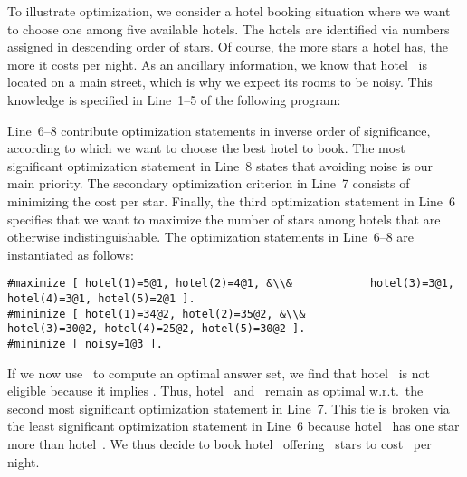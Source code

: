 \begin{example}\label{ex:opt}
To illustrate optimization, we consider a hotel booking situation
where we want to choose one among five available hotels.
The hotels are identified via numbers assigned in descending order of stars.
Of course, the more stars a hotel has, the more it costs per night.
As an ancillary information, we know that hotel~ is located
on a main street, which is why we expect its rooms to be noisy.
This knowledge is specified in Line~1--5 of the following program:
%

%
Line~6--8 contribute optimization statements in inverse order of significance,
according to which we want to choose the best hotel to book.
The most significant optimization statement in Line~8 states that
avoiding noise is our main priority.
The secondary optimization criterion in Line~7 consists of
minimizing the cost per star.
Finally, the third optimization statement in Line~6 specifies that we want
to maximize the number of stars among hotels that are otherwise indistinguishable.
The optimization statements in Line~6--8 are instantiated as follows:%
%
\begin{lstlisting}[firstnumber=6,breakindent=0pt,escapechar=&]
#maximize [ hotel(1)=5@1, hotel(2)=4@1, &\\&            hotel(3)=3@1, hotel(4)=3@1, hotel(5)=2@1 ].
#minimize [ hotel(1)=34@2, hotel(2)=35@2, &\\&            hotel(3)=30@2, hotel(4)=25@2, hotel(5)=30@2 ].
#minimize [ noisy=1@3 ].
\end{lstlisting}
If we now use \clasp\ to compute an optimal answer set,%
we find that hotel~ is not eligible because it implies .
Thus, hotel~ and~ remain as optimal w.r.t.\ the second most
significant optimization statement in Line~7.
This tie is broken via the least significant optimization statement in Line~6
because hotel~ has one star more than hotel~.
We thus decide to book hotel~ offering~ stars
to cost~ per night.
\eexample
\end{example}


